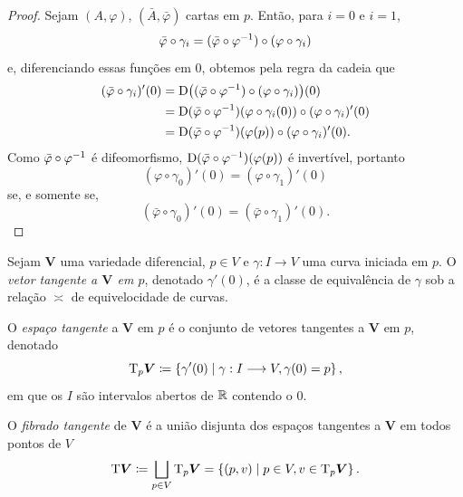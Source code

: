 \begin{proof}
Sejam $(A,\varphi)$, $(\bar A,\bar \varphi)$ cartas em $p$. Então, para $i=0$ e $i=1$,
	\begin{equation*}
	\bar\varphi \circ \gamma_i = (\bar\varphi \circ \varphi^{-1}) \circ (\varphi \circ \gamma_i)
	\end{equation*}
e, diferenciando essas funções em $0$, obtemos pela regra da cadeia que
	\begin{align*}
	(\bar\varphi \circ \gamma_i)'(0) &= \mathrm{D} \big( (\bar\varphi \circ \varphi^{-1}) \circ (\varphi \circ \gamma_i) \big)(0) \\
	&= \mathrm{D}(\bar\varphi \circ \varphi^{-1})(\varphi \circ \gamma_i(0)) \circ (\varphi \circ \gamma_i)'(0) \\
	&=  \mathrm{D}(\bar\varphi \circ \varphi^{-1})(\varphi(p)) \circ (\varphi \circ \gamma_i)'(0).
	\end{align*}
Como $\bar\varphi \circ \varphi^{-1}$ é difeomorfismo, $\mathrm{D}(\bar\varphi \circ \varphi^{-1})(\varphi(p))$ é invertível, portanto
	\begin{equation*}
	(\varphi \circ \gamma_0)'(0) = (\varphi \circ \gamma_1)'(0)
	\end{equation*}
se, e somente se,
	\begin{equation*}
	(\bar\varphi \circ \gamma_0)'(0) = (\bar\varphi \circ \gamma_1)'(0).
	\end{equation*}
\end{proof}

\begin{defi}
Sejam $\bm V$ uma variedade diferencial, $p \in V$ e $\gamma: I \to V$ uma curva iniciada em $p$. O \emph{vetor tangente a $\bm V$ em $p$}, denotado $\gamma'(0)$, é a classe de equivalência de $\gamma$ sob a relação $\asymp$ de equivelocidade de curvas.

O \emph{espaço tangente} a $\bm V$ em $p$ é o conjunto de vetores tangentes a $\bm V$ em $p$, denotado
	\begin{equation*}
	\mathrm{T}_p\bm V \coloneqq \left\{\gamma'(0) \;\middle\vert\; \gamma: I \longrightarrow V, \gamma(0)=p \right\},
	\end{equation*}
em que os $I$ são intervalos abertos de $\mathbb{R}$ contendo o $0$.

O \emph{fibrado tangente} de $\bm V$ é a união disjunta dos espaços tangentes a $\bm V$ em todos pontos de $V$
	\begin{equation*}
	\mathrm{T}\bm V \coloneqq \bigsqcup_{p  \in V} \mathrm{T}_p\bm V = \left\{(p,v) \;\middle\vert\; p \in V,v \in \mathrm{T}_p\bm V \right\}.
	\end{equation*}
\end{defi}

